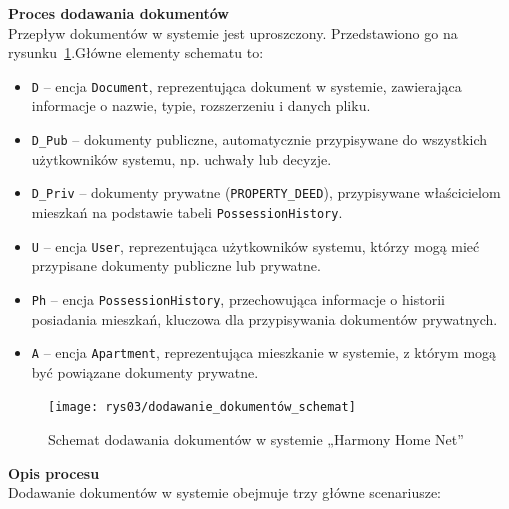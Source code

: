
\noindent \textbf{Proces dodawania dokumentów}\\
Przepływ dokumentów w systemie jest uproszczony. Przedstawiono go na rysunku~\ref{fig:document_schema}.Główne elementy schematu to:

\begin{itemize}
    \item \texttt{D} -- encja \texttt{Document}, reprezentująca dokument w systemie, zawierająca informacje o nazwie, typie, rozszerzeniu i danych pliku.
    \item \texttt{D\_Pub} -- dokumenty publiczne, automatycznie przypisywane do wszystkich użytkowników systemu, np. uchwały lub decyzje.
    \item \texttt{D\_Priv} -- dokumenty prywatne (\texttt{PROPERTY\_DEED}), przypisywane właścicielom mieszkań na podstawie tabeli \texttt{PossessionHistory}.
    \item \texttt{U} -- encja \texttt{User}, reprezentująca użytkowników systemu, którzy mogą mieć przypisane dokumenty publiczne lub prywatne.
    \item \texttt{Ph} -- encja \texttt{PossessionHistory}, przechowująca informacje o historii posiadania mieszkań, kluczowa dla przypisywania dokumentów prywatnych.
    \item \texttt{A} -- encja \texttt{Apartment}, reprezentująca mieszkanie w systemie, z którym mogą być powiązane dokumenty prywatne.
\end{itemize}

\begin{figure}[ht]
    \centering
    \texttt{[image: rys03/dodawanie\_dokumentów\_schemat]}
    \caption{Schemat dodawania dokumentów w systemie „Harmony Home Net”}
    \label{fig:document_schema}
\end{figure}

\noindent \textbf{Opis procesu}\\
Dodawanie dokumentów w systemie obejmuje trzy główne scenariusze:

